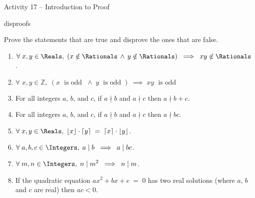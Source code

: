 \documentclass{amsart}
\begin{document}
\thispagestyle{empty}

\centerline{\Large Activity 17 -- Introduction to Proof}
\centerline{\large disproofs}

\bigskip
\Large

Prove the statements that are true and disprove the ones that are false.

\vspace{.3in}

\begin{enumerate}

\item $ \displaystyle \forall \; x, y \in \Reals, \; ( x \notin \Rationals \, \land \, y \notin \Rationals ) \; \implies \; xy \notin \Rationals$.

\vfill

\item $\displaystyle \forall \; x,y \in {\mathbb Z}, \; ( x \; \mbox{ is odd } \;
\wedge \; y \; \mbox{ is odd }) \; \implies \; xy \; \mbox{ is odd }$

\vfill

\item For all integers $a$, $b$, and $c$, if $a \nmid b$ and $a \nmid c$ then $a \nmid b+c$.

\vfill

\item For all integers $a$, $b$, and $c$, if $a \nmid b$ and $a \nmid c$ then $a \nmid bc$.

\vfill

\item $ \displaystyle \forall \; x, y \in \Reals, \; \lfloor x \rfloor \cdot \lceil y \rceil \; = \; \lceil x \rceil \cdot \lfloor y \rfloor $.

\vfill

\item $ \displaystyle \forall \; a, b, c \in \Integers, \; a \mid b \; \implies \; a \mid bc$.

\vfill

\item $ \displaystyle \forall \; m, n \in \Integers, \; n \mid m^2 \; \implies \; n \mid m$.

\vfill

\item If the quadratic equation $ax^2+bx+c \; = \; 0$ has two real solutions (where $a$, $b$ and $c$ are real) then $ac < 0$.

\vfill

\end{enumerate}
\end{document}
